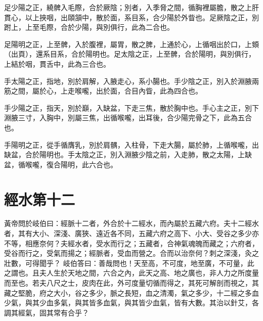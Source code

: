 足少陽之正，繞髀入毛際，合於厥陰；別者，入季脅之間，循胸裡屬膽，散之上肝貫心，以上挾咽，出頤頷中，散於面，系目系，合少陽於外眥也。足厥陰之正，別跗上，上至毛際，合於少陽，與別俱行，此為二合也。

足陽明之正，上至髀，入於腹裡，屬胃，散之脾，上通於心，上循咽出於口，上頞（出頁），還系目系，合於陽明也。足太陰之正，上至髀，合於陽明，與別俱行，上結於咽，貫舌中，此為三合也。

手太陽之正，指地，別於肩解，入腋走心，系小腸也。手少陰之正，別入於淵腋兩筋之間，屬於心，上走喉嚨，出於面，合目內眥，此為四合也。

手少陽之正，指天，別於巔，入缺盆，下走三焦，散於胸中也。手心主之正，別下淵腋三寸，入胸中，別屬三焦，出循喉嚨，出耳後，合少陽完骨之下，此為五合也。

手陽明之正，從手循膺乳，別於肩髃，入柱骨，下走大腸，屬於肺，上循喉嚨，出缺盆，合於陽明也。手太陰之正，別入淵腋少陰之前，入走肺，散之太陽，上缺盆，循喉嚨，復合陽明，此六合也。




\section{經水第十二}

黃帝問於岐伯曰：經脈十二者，外合於十二經水，而內屬於五藏六府。夫十二經水者，其有大小、深淺、廣狹、遠近各不同，五藏六府之高下、小大、受谷之多少亦不等，相應奈何？夫經水者，受水而行之；五藏者，合神氣魂魄而藏之；六府者，受谷而行之，受氣而揚之；經脈者，受血而營之。合而以治奈何？刺之深淺，灸之壯數，可得聞乎？
岐伯答曰：善哉問也！天至高，不可度，地至廣，不可量，此之謂也。且夫人生於天地之間，六合之內，此天之高、地之廣也，非人力之所度量而至也。若夫八尺之士，皮肉在此，外可度量切循而得之，其死可解剖而視之，其藏之堅脆，府之大小，谷之多少，脈之長短，血之清濁，氣之多少，十二經之多血少氣，與其少血多氣，與其皆多血氣，與其皆少血氣，皆有大數。其治以針艾，各調其經氣，固其常有合乎？

